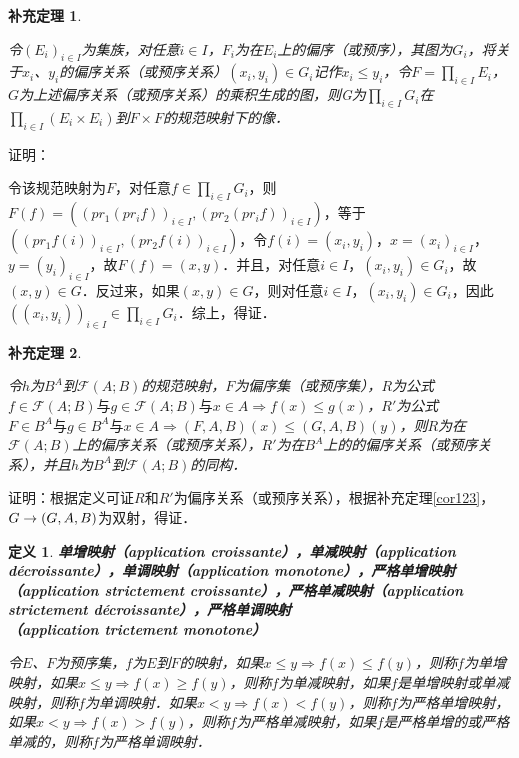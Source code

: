 \documentclass[12pt, a4paper, oneside]{book}
\newtheorem{cor}{补充定理}
\newtheorem{de}{定义}
\begin{document}
			\begin{cor}\label{cor162}
				\hfill\par
				令$(E_i)_{i\in I}$为集族，对任意$i\in I$，$F_i$为在$E_i$上的偏序（或预序），其图为$G_i$，将关于$x_i$、$y_i$的偏序关系（或预序关系）$(x_i, y_i)\in G_i$记作$x_i\leq y_i$，令$F=\prod\limits_{i\in I}E_i$，$G$为上述偏序关系（或预序关系）的乘积生成的图，则G为$\prod\limits_{i\in I}G_i$在$\prod\limits_{i\in I}(E_i\times E_i)$到$F\times F$的规范映射下的像．
			\end{cor}
			证明：
			\par
			令该规范映射为$F$，对任意$f\in \prod\limits_{i\in I}G_i$，则$F(f)=((pr_1(pr_if))_{i\in I}, (pr_2(pr_if))_{i\in I})$，等于$((pr_1f(i))_{i\in I}, (pr_2f(i))_{i\in I})$，令$f(i)=(x_i, y_i)$，$x=(x_i)_{i\in I}$，$y=(y_i)_{i\in I}$，故$F(f)=(x, y)$．并且，对任意$i \in I$，$(x_i, y_i)\in G_i$，故$(x, y)\in G$．反过来，如果$(x, y)\in G$，则对任意$i\in I$，$(x_i, y_i)\in G_i$，因此$((x_i, y_i))_{i\in I}\in \prod\limits_{i\in I}G_i$．综上，得证．
						
			\begin{cor}\label{cor163}
				\hfill\par
				令$h$为$B^A$到$\mathcal{F}(A; B)$的规范映射，$F$为偏序集（或预序集），$R$为公式$f\in \mathcal{F}(A; B)\text{与}g\in \mathcal{F}(A; B)\text{与} x\in A\Rightarrow f(x)\leq g(x)$，$R'$为公式$F\in B^A\text{与}g\in B^A\text{与}x\in A\Rightarrow (F, A, B)(x)\leq (G, A, B)(y)$，则$R$为在$\mathcal{F}(A; B)$上的偏序关系（或预序关系），$R'$为在$B^A$上的的偏序关系（或预序关系），并且$h$为$B^A$到$\mathcal{F}(A; B)$的同构．
			\end{cor}
			证明：根据定义可证$R$和$R'$为偏序关系（或预序关系），根据补充定理\ref{cor123}，$G\to \\(G, A, B)$为双射，得证．

			\begin{de}
				\textbf{单增映射（application croissante），单减映射（application décroissante），单调映射（application monotone），严格单增映射（application strictement croissante），严格单减映射（application strictement décroissante），严格单调映射\\（application trictement monotone）}
				\par
				令$E$、$F$为预序集，$f$为$E$到$F$的映射，如果$x\leq y\Rightarrow f(x)\leq f(y)$，则称$f$为单增映射，如果$x\leq y\Rightarrow f(x)\geq f(y)$，则称$f$为单减映射，如果$f$是单增映射或单减映射，则称$f$为单调映射．如果$x<y\Rightarrow f(x)<f(y)$，则称$f$为严格单增映射，如果$x<y\Rightarrow f(x)>f(y)$，则称$f$为严格单减映射，如果$f$是严格单增的或严格单减的，则称$f$为严格单调映射．
			\end{de}
						
\end{document}

